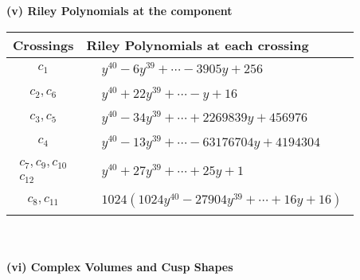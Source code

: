 \documentclass[1p]{elsarticle_modified}
\theoremstyle{definition}
\begin{document}
\newpage\renewcommand{\arraystretch}{1}
\flushleft \textbf{(v) Riley Polynomials at the component}\newline \\
\begin{tabular}{m{50pt}|m{274pt}}
Crossings & \hspace{64pt}Riley Polynomials at each crossing \\
\hline $$\begin{aligned}c_{1}\end{aligned}$$&$\begin{aligned}
&y^{40}-6 y^{39}+\cdots-3905 y+256
\end{aligned}$\\
\hline $$\begin{aligned}c_{2},c_{6}\end{aligned}$$&$\begin{aligned}
&y^{40}+22 y^{39}+\cdots- y+16
\end{aligned}$\\
\hline $$\begin{aligned}c_{3},c_{5}\end{aligned}$$&$\begin{aligned}
&y^{40}-34 y^{39}+\cdots+2269839 y+456976
\end{aligned}$\\
\hline $$\begin{aligned}c_{4}\end{aligned}$$&$\begin{aligned}
&y^{40}-13 y^{39}+\cdots-63176704 y+4194304
\end{aligned}$\\
\hline $$\begin{aligned}c_{7},c_{9},c_{10}\\c_{12}\end{aligned}$$&$\begin{aligned}
&y^{40}+27 y^{39}+\cdots+25 y+1
\end{aligned}$\\
\hline $$\begin{aligned}c_{8},c_{11}\end{aligned}$$&$\begin{aligned}
&1024(1024 y^{40}-27904 y^{39}+\cdots+16 y+16)
\end{aligned}$\\
\hline
\end{tabular}\\~\\
\newpage\flushleft \textbf{(vi) Complex Volumes and Cusp Shapes}
\end{document}
